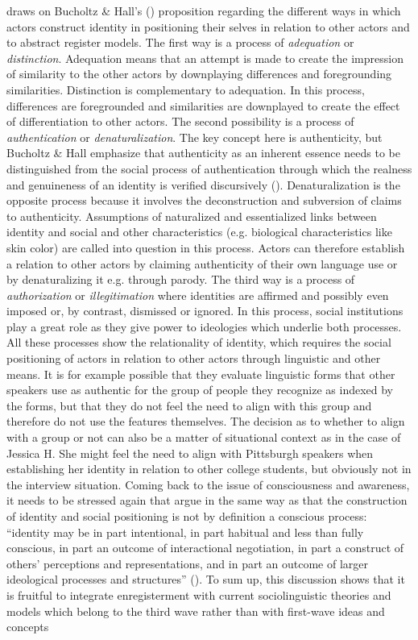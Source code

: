 \citet{Spitzmuller2013} draws on Bucholtz \& Hall’s (\citeyear{Bucholtz2006, Bucholtz2005}) proposition regarding the different ways in which actors construct identity in positioning their selves in relation to other actors and to abstract register models. The first way is a process of \textit{adequation} or \textit{distinction}. Adequation means that an attempt is made to create the impression of similarity to the other actors by downplaying differences and foregrounding similarities. Distinction is complementary to adequation. In this process, differences are foregrounded and similarities are downplayed to create the effect of differentiation to other actors. The second possibility is a process of \textit{authentication} or \textit{denaturalization}. The key concept here is authenticity, but Bucholtz \& Hall emphasize that authenticity as an inherent essence needs to be distinguished from the social process of authentication through which the realness and genuineness of an identity is verified discursively (\citeyear[601]{Bucholtz2005}). Denaturalization is the opposite process because it involves the deconstruction and subversion of claims to authenticity. Assumptions of naturalized and essentialized links between identity and social and other characteristics (e.g. biological characteristics like skin color) are called into question in this process. Actors can therefore establish a relation to other actors by claiming authenticity of their own language use or by denaturalizing it e.g. through parody. The third way is a process of \textit{authorization} or \textit{illegitimation} where identities are affirmed and possibly even imposed or, by contrast, dismissed or ignored. In this process, social institutions play a great role as they give power to ideologies which underlie both processes. All these processes show the relationality of identity, which requires the social positioning of actors in relation to other actors through linguistic and other means. It is for example possible that they evaluate linguistic forms that other speakers use as authentic for the group of people they recognize as indexed by the forms, but that they do not feel the need to align with this group and therefore do not use the features themselves. The decision as to whether to align with a group or not can also be a matter of situational context as in the case of Jessica H. She might feel the need to align with Pittsburgh speakers when establishing her identity in relation to other college students, but obviously not in the interview situation. Coming back to the issue of consciousness and awareness, it needs to be stressed again that \citet{Bucholtz2005} argue in the same way as \citet{Eckert2016} that the construction of identity and social positioning is not by definition a conscious process: “identity may be in part intentional, in part habitual and less than fully conscious, in part an outcome of interactional negotiation, in part a construct of others’ perceptions and representations, and in part an outcome of larger ideological processes and structures” (\citeyear[585]{Bucholtz2005}). To sum up, this discussion shows that it is fruitful to integrate enregisterment with current sociolinguistic theories and models which belong to the third wave rather than with first-wave ideas and concepts 